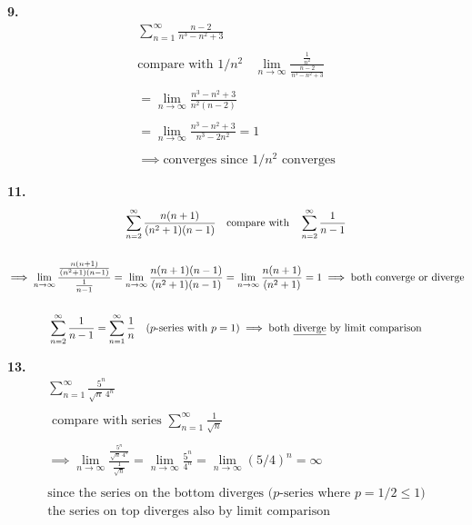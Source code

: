 \documentclass{article}
\begin{document}
\newpage



\noindent
\textbf{
9.
}
\\
\begin{gather*}
\sum_{n=1}^{\infty} \frac{n-2}{n^3-n^2+3}
\\
\\
\text{compare with } 1/n^2
~~~~
\lim_{n \to \infty} \frac{\frac{1}{n^2}}{\frac{n-2}{n^3-n^2+3}}
\\
\\
=\lim_{n \to \infty} \frac{n^3-n^2+3}{n^2(n-2)}
\\
\\
=\lim_{n \to \infty} \frac{n^3-n^2+3}{n^3-2n^2}=1
\\
\\
\implies
\text{converges since $1/n^2$ converges}
\end{gather*}



\noindent
\textbf{
11.
}
\\
\begin{gather*}
\sum_{n=2}^{\infty} \frac{n(n+1)}{(n^2+1)(n-1)}
~~~\text{compare with}~~~
\sum_{n=2}^{\infty} \frac{1}{n-1}
\\
\\
\implies
\lim_{n \to \infty} \frac{\frac{n(n+1)}{(n^2+1)(n-1)}}{\frac{1}{n-1}}
=\lim_{n \to \infty} \frac{n(n+1)(n-1)}{(n^2+1)(n-1)}
=\lim_{n \to \infty} \frac{n(n+1)}{(n^2+1)}=1 \implies \text{both converge or diverge}
\\
\\
\sum_{n=2}^{\infty} \frac{1}{n-1}
=\sum_{n=1}^{\infty} \frac{1}{n}
~~~\text{($p$-series with $p=1$)} \implies \text{both \underline{diverge} by limit comparison}
\end{gather*}



\noindent
\textbf{
13.
}
\\
\begin{gather*}
\sum_{n=1}^{\infty} \frac{5^n}{\sqrt{n}~4^n}
\\
\\
\text{ compare with series }
\sum_{n=1}^{\infty} \frac{1}{\sqrt{n}}
\\
\\
\implies
\lim_{n \to \infty} \frac{\frac{5^n}{\sqrt{n}~4^n}}{\frac{1}{\sqrt{n}}}
= \lim_{n \to \infty} \frac{5^n}{4^n}= \lim_{n \to \infty}(5/4)^n=\infty
\\
\\
\text{since the series on the bottom diverges ($p$-series where $p=1/2\leq1$)}
\\
\text{the series on top diverges also by limit comparison}
\end{gather*}
\end{document}

